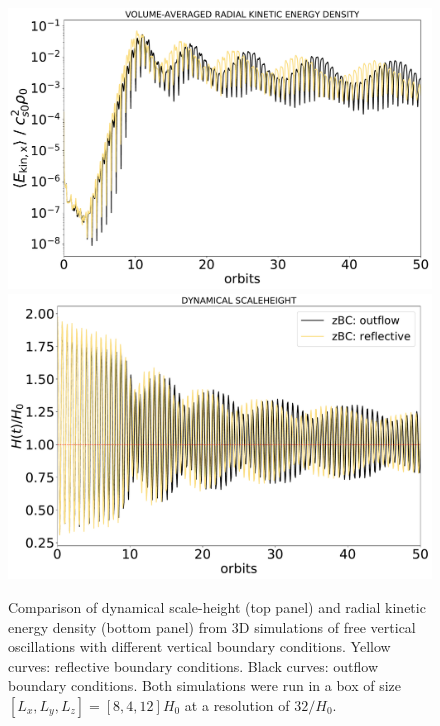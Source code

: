 \documentclass[fleqn,usenatbib]{mnras}
\begin{document}
\begin{figure}
\centering
\includegraphics[scale=0.24]{Figures/figure00PRODUCTION_VSTRHYDRORes32Re4687H6BouncezBCOutflowComparison_timeevolution_volavg_kineticenergydensity_xcomp.pdf}
\includegraphics[scale=0.24]{Figures/figure00PRODUCTION_VSTRHYDRORes32Re4687H6BouncezBCOutflowComparison_timeevolution_dynamicalH.pdf}
\caption{Comparison of dynamical scale-height (top panel) and radial kinetic energy density (bottom panel) from 3D simulations of free vertical oscillations with different vertical boundary conditions. Yellow curves: reflective boundary conditions. Black curves: outflow boundary conditions. Both simulations were run in a box of size $[L_x,L_y,L_z]=[8,4,12]H_0$ at a resolution of $32/H_0$.}
\label{FIGURE_FreeBouncezBCComparison}
\end{figure}
\end{document}
